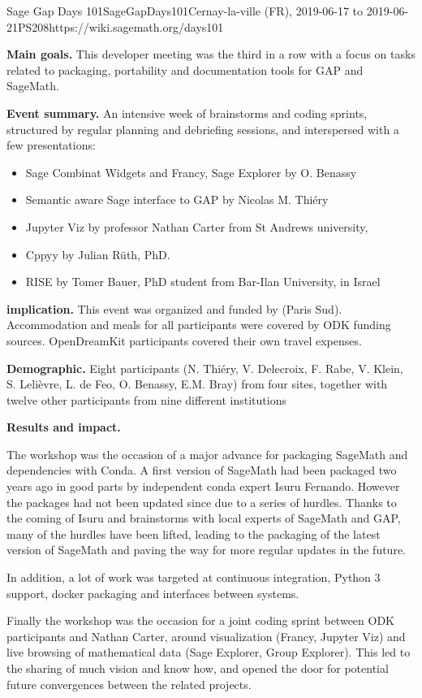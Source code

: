 \begin{event}{Sage Gap Days 101}{SageGapDays101}{Cernay-la-ville (FR), 2019-06-17 to 2019-06-21}{PS}{20}{8}{https://wiki.sagemath.org/days101}

\textbf{Main goals.} This developer meeting was the third in a row
with a focus on \ODK tasks related to packaging, portability and
documentation tools for GAP and SageMath.


\textbf{Event summary.} An intensive week of brainstorms and coding
sprints, structured by regular planning and debriefing sessions, and
interspersed with a few presentations:
\begin{itemize}
\item Sage Combinat Widgets and Francy, Sage Explorer by O. Benassy
\item Semantic aware Sage interface to GAP by Nicolas M. Thiéry
\item Jupyter Viz by professor Nathan Carter from St Andrews
  university,
\item Cppyy by Julian Rüth, PhD.
\item RISE by Tomer Bauer, PhD student from Bar-Ilan University, in
  Israel
\end{itemize}

\textbf{\ODK implication.} This event was organized and funded by \ODK
(Paris Sud). Accommodation and meals for all participants were covered
by ODK funding sources. OpenDreamKit participants covered their own
travel expenses.

\textbf{Demographic.} Eight \ODK participants (N. Thiéry, V.
Delecroix, F. Rabe, V. Klein, S. Lelièvre, L. de Feo, O. Benassy, E.M.
Bray) from four sites, together with twelve other participants from
nine different institutions


\textbf{Results and impact.}

The workshop was the occasion of a major advance for packaging
SageMath and dependencies with Conda. A first version of SageMath had
been packaged two years ago in good parts by independent conda expert
Isuru Fernando. However the packages had not been updated since due to
a series of hurdles. Thanks to the coming of Isuru and brainstorms
with local experts of SageMath and GAP, many of the hurdles have been
lifted, leading to the packaging of the latest version of SageMath and
paving the way for more regular updates in the future.

In addition, a lot of work was targeted at continuous integration,
Python 3 support, docker packaging and interfaces between systems.

Finally the workshop was the occasion for a joint coding sprint
between ODK participants and Nathan Carter, around visualization
(Francy, Jupyter Viz) and live browsing of mathematical data (Sage
Explorer, Group Explorer). This led to the sharing of much vision and
know how, and opened the door for potential future convergences
between the related projects.

\end{event}
